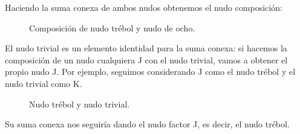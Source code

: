 \documentclass[14pt]{extarticle}
\begin{document}
Haciendo la suma conexa de ambos nudos obtenemos el nudo composición:
  \begin{figure}[h!]
  	\centering
  	\caption{Composición de nudo trébol y nudo de ocho.}
  	\label{comp2} 
  \end{figure}
  
  
  El nudo trivial es un elemento identidad para la suma conexa: si hacemos la composición de un nudo cualquiera J con el nudo trivial, vamos a obtener el propio nudo J. Por ejemplo, seguimos considerando J como el nudo trébol y el nudo trivial como K. \\
   \begin{figure}[h!]
   	\centering
   	\caption{Nudo trébol y nudo trivial.}
   	\label{comp3} 
   \end{figure}
   
  Su suma conexa nos seguiría dando el nudo factor J, es decir, el nudo trébol.\\
   
\end{document}
